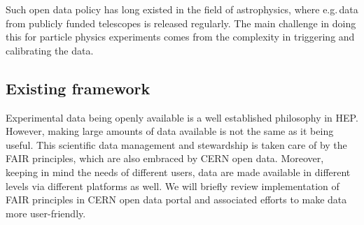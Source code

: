 \documentclass[10pt]{article}
\begin{document}
Such open data policy has long existed in the field of astrophysics, where e.g.\,data from publicly funded telescopes is released regularly.  The main challenge in doing this for particle physics experiments comes from the complexity in triggering and calibrating the data.  


\subsection{Existing framework}
%
Experimental data being openly available is a well established philosophy in HEP. However, making large amounts of data available is not the same as it being useful. This scientific data management and stewardship is taken care of by the FAIR principles, which are also embraced by CERN open data. Moreover, keeping in mind the needs of different users, data are made available in different levels via different platforms as well. We will briefly review implementation of FAIR principles in CERN open data portal and associated efforts to make data more user-friendly. 
\end{document}
